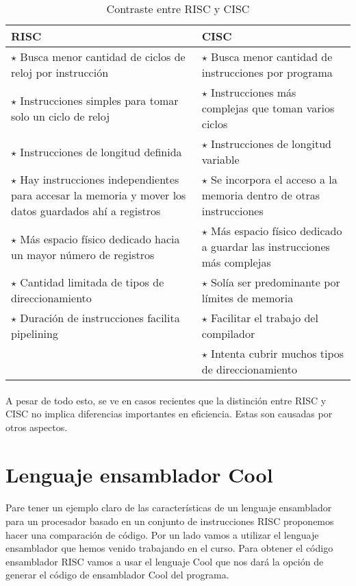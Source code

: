\documentclass[10pt,a4paper]{article}
\begin{document}
\begin{center}
\begin{table}[H]
\begin{tabular}{| p{5cm} | p{5cm} |}
\hline
RISC & CISC \\ \hline
$\star$ Busca menor cantidad de ciclos de reloj por instrucción & $\star$ Busca menor cantidad de instrucciones por programa \\
$\star$ Instrucciones simples para tomar solo un ciclo de reloj & $\star$ Instrucciones más complejas que toman varios ciclos \\
$\star$ Instrucciones de longitud definida & $\star$ Instrucciones de longitud variable\\
$\star$ Hay instrucciones independientes para accesar la memoria y mover los datos guardados ahí a registros & $\star$ Se incorpora el acceso a la memoria dentro de otras instrucciones\\
$\star$ Más espacio físico dedicado hacia un mayor número de registros & $\star$ Más espacio físico dedicado a guardar las instrucciones más complejas\\
$\star$ Cantidad limitada de tipos de direccionamiento & $\star$ Solía ser predominante por límites de memoria\\
$\star$ Duración de instrucciones facilita pipelining & $\star$ Facilitar el trabajo del compilador\\
\vphantom{A} & $\star$ Intenta cubrir muchos tipos de direccionamiento\\
\hline
\end{tabular}
\caption{Contraste entre RISC y CISC}
\end{table}
\end{center}
\paragraph{}
A pesar de todo esto, se ve en casos recientes que la distinción entre RISC y CISC no implica diferencias importantes en eficiencia. Estas son causadas por otros aspectos.


\section*{Lenguaje ensamblador Cool}
\paragraph{}
Pare tener un ejemplo claro de las características de un lenguaje ensamblador para un procesador basado en un conjunto de instrucciones RISC proponemos hacer una comparación de código. Por un lado vamos a utilizar el lenguaje ensamblador que hemos venido trabajando en el curso. Para obtener el código ensamblador RISC vamos a usar el lenguaje Cool que nos dará la opción de generar el código de ensamblador Cool del programa.
\end{document}
